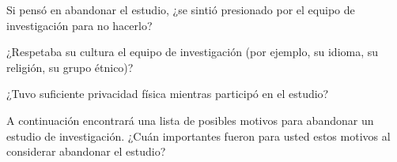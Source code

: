 \documentclass[spanish,pagemark,stamp,oneside,print_questionnaire_id]{sdapsclassic}
\begin{document}
\begin{questionnaire}
\begin{Form}
                        \begin{optionquestion}[singlechoice,cols=1]{Si pensó en abandonar el estudio, ¿se sintió presionado por el equipo de investigación para no hacerlo?}\end{optionquestion}
                        \begin{optionquestion}[singlechoice,cols=1]{¿Respetaba su cultura el equipo de investigación (por ejemplo, su idioma, su religión, su grupo étnico)?}\end{optionquestion}
                        \begin{optionquestion}[singlechoice,cols=1]{¿Tuvo suficiente privacidad física mientras participó en el estudio?}\end{optionquestion}
                           \begin{optiongroup}{A continuación encontrará una lista de posibles motivos para abandonar un estudio de investigación. ¿Cuán importantes fueron para usted estos motivos al considerar abandonar el estudio?}
                        
                            
                            
                            
                            
                    
                    
                    
                    
                    

\end{optiongroup}
\end{Form}
\end{questionnaire}
\end{document}
